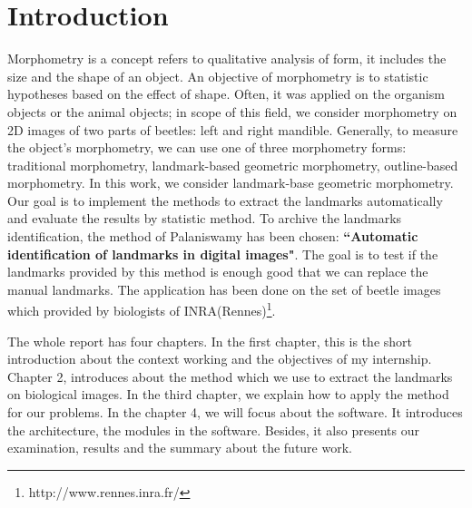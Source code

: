 \chapter*{Introduction}
Morphometry is a concept refers to qualitative analysis of form, it includes the size and the shape of an object. An objective of morphometry is to statistic hypotheses based on the effect of shape. Often, it was applied on the organism objects or the animal objects; in scope of this field, we consider morphometry on 2D images of two parts of beetles: left and right mandible. Generally, to measure the object's morphometry, we can use one of three morphometry forms: traditional morphometry, landmark-based geometric morphometry, outline-based morphometry. In this work, we consider landmark-base geometric morphometry. Our goal is to implement the methods to extract the landmarks automatically and evaluate the results by statistic method. To archive the landmarks identification, the method of Palaniswamy\cite{palaniswamy2010automatic} has been chosen: \textbf{``Automatic identification of landmarks in digital images"}. The goal is to test if the landmarks provided by this method is enough good that we can replace the manual landmarks. The application has been done on the set of beetle images which provided by biologists of INRA(Rennes)\footnote{http://www.rennes.inra.fr/}.

The whole report has four chapters. In the first chapter, this is the short introduction about the context working and the objectives of my internship. Chapter 2, introduces about the method which we use to extract the landmarks on biological images. In the third chapter, we explain how to apply the method for our problems. In the chapter 4, we will focus about the software. It introduces the architecture, the modules in the software. Besides, it also presents our examination, results and the summary about the future work.